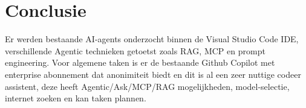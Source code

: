 
\chapter{Conclusie}%
\label{ch:conclusie}

Er werden bestaande AI-agents onderzocht binnen de Visual Studio Code IDE, verschillende Agentic technieken getoetst zoals RAG, MCP en prompt engineering. Voor algemene taken is er de bestaande Github Copilot met enterprise abonnement dat anonimiteit biedt en dit is al een zeer nuttige codeer assistent, deze heeft Agentic/Ask/MCP/RAG mogelijkheden, model-selectie, internet zoeken en kan taken plannen. \\

